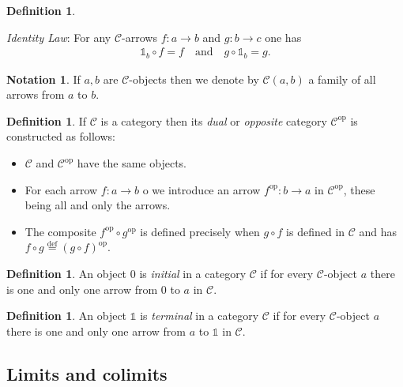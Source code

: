 \documentclass[10]{article}
\theoremstyle{plain}
\theoremstyle{definition}
\theoremstyle{definition}
\newtheorem{notation}[prop]{Notation}
\newtheorem{definition}[prop]{Definition}
\numberwithin{equation}{section}
\newcommand{\7}{\dagger}                     %
\newcommand{\8}{\bullet}                     %
\renewcommand{\.}{\cdot}                     %
\renewcommand{\:}{\colon}                    %
\newcommand{\bydef}{\stackrel{\mathrm{def}}{=}}          %
\renewcommand{\:}{\colon}           %
\newcommand{\bean}{\begin{eqnarray*}}
\newcommand{\eean}{\end{eqnarray*}}
\begin{document}
\begin{appendices}
\begin{definition}
\begin{itemize}
			\textit{Identity Law}: For any $\mathscr{C}$-arrows $f: a \to b$ and $g : b \to c$ one has
			\bean
			\mathbb{1}_b \circ f = f \quad \text{and}\quad g\circ \mathbb{1}_b= g.
			\eean
		\end{itemize}
		
	\end{definition}
	
	\begin{notation}\label{category_not}
		If $a, b$ are  $\mathscr{C}$-objects then we denote by  $\mathscr{C}\left(a, b \right)$  a family of all arrows from $a$ to $b$.
	\end{notation}
	\begin{definition}\label{dual_cat_defn}\cite{goldblatt:topoi}
		If  $\mathscr C$ is a category then its \textit{dual} or \textit{opposite} category $\mathscr C^{\mathrm{op}}$ is constructed as follows: 
		\begin{itemize}
			\item $\mathscr C$ and $\mathscr C^{\mathrm{op}}$ have the same objects.
			\item For each arrow $f: a\to b$ o we 
			introduce an arrow  $f^{\mathrm{op}}: b\to a$ in $\mathscr C^{\mathrm{op}}$, these being all and only the arrows.
			\item  The composite $f^{\mathrm{op}}\circ g^{\mathrm{op}}$ is defined precisely when $g\circ f$ is defined in $\mathscr C$
			and has $f\circ g\bydef \left(g\circ f \right)^{\mathrm{op}}$.
		\end{itemize}
		
	\end{definition}
	\begin{definition}\label{init_ob_defn}\cite{goldblatt:topoi}
		An object $0$ is \textit{initial} in a category $\mathscr C$ if for every $\mathscr C$-object $a$ there is one and only one arrow from $0$ to $a$ in $\mathscr C$.
	\end{definition}
	\begin{definition}\label{term_ob_defn}\cite{goldblatt:topoi}
		An object $\mathbb{1}$ is \textit{terminal} in a category $\mathscr C$ if for every $\mathscr C$-object $a$ there is one and only one arrow from $a$ to $\mathbb{1}$ in $\mathscr C$.
	\end{definition}
	
	
	\subsection{Limits and colimits}\label{limit_sec}

\end{appendices}
\end{document}
